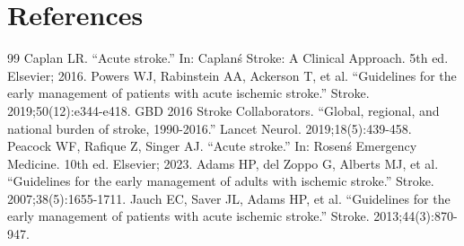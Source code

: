 \section*{References}
\begin{thebibliography}{99}
 Caplan LR. ``Acute stroke.'' In: Caplan\'s Stroke: A Clinical Approach. 5th ed. Elsevier; 2016.
 Powers WJ, Rabinstein AA, Ackerson T, et al. ``Guidelines for the early management of patients with acute ischemic stroke.'' Stroke. 2019;50(12):e344-e418.
 GBD 2016 Stroke Collaborators. ``Global, regional, and national burden of stroke, 1990-2016.'' Lancet Neurol. 2019;18(5):439-458.
 Peacock WF, Rafique Z, Singer AJ. ``Acute stroke.'' In: Rosen\'s Emergency Medicine. 10th ed. Elsevier; 2023.
 Adams HP, del Zoppo G, Alberts MJ, et al. ``Guidelines for the early management of adults with ischemic stroke.'' Stroke. 2007;38(5):1655-1711.
 Jauch EC, Saver JL, Adams HP, et al. ``Guidelines for the early management of patients with acute ischemic stroke.'' Stroke. 2013;44(3):870-947.
\end{thebibliography}
